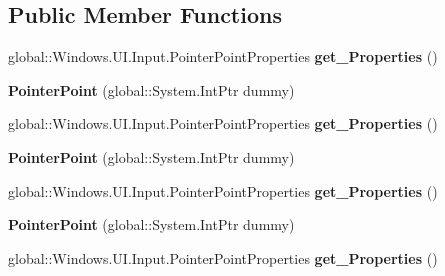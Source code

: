 \subsection*{Public Member Functions}
\begin{DoxyCompactItemize}
\item 
\mbox{\label{class_windows_1_1_u_i_1_1_input_1_1_pointer_point_ad62db209242f432982245445ecc78851}} 
global\+::\+Windows.\+U\+I.\+Input.\+Pointer\+Point\+Properties {\bfseries get\+\_\+\+Properties} ()
\item 
\mbox{\label{class_windows_1_1_u_i_1_1_input_1_1_pointer_point_ae066090ae0399abeb3a964b540ab3bd4}} 
{\bfseries Pointer\+Point} (global\+::\+System.\+Int\+Ptr dummy)
\item 
\mbox{\label{class_windows_1_1_u_i_1_1_input_1_1_pointer_point_ad62db209242f432982245445ecc78851}} 
global\+::\+Windows.\+U\+I.\+Input.\+Pointer\+Point\+Properties {\bfseries get\+\_\+\+Properties} ()
\item 
\mbox{\label{class_windows_1_1_u_i_1_1_input_1_1_pointer_point_ae066090ae0399abeb3a964b540ab3bd4}} 
{\bfseries Pointer\+Point} (global\+::\+System.\+Int\+Ptr dummy)
\item 
\mbox{\label{class_windows_1_1_u_i_1_1_input_1_1_pointer_point_ad62db209242f432982245445ecc78851}} 
global\+::\+Windows.\+U\+I.\+Input.\+Pointer\+Point\+Properties {\bfseries get\+\_\+\+Properties} ()
\item 
\mbox{\label{class_windows_1_1_u_i_1_1_input_1_1_pointer_point_ae066090ae0399abeb3a964b540ab3bd4}} 
{\bfseries Pointer\+Point} (global\+::\+System.\+Int\+Ptr dummy)
\item 
\mbox{\label{class_windows_1_1_u_i_1_1_input_1_1_pointer_point_ad62db209242f432982245445ecc78851}} 
global\+::\+Windows.\+U\+I.\+Input.\+Pointer\+Point\+Properties {\bfseries get\+\_\+\+Properties} ()
\item 

\end{DoxyCompactItemize}
